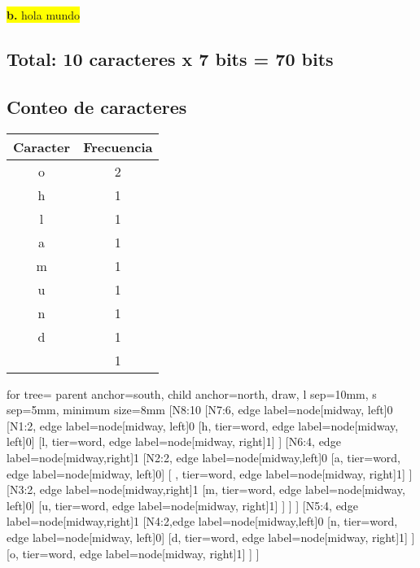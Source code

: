 \documentclass{article}
\begin{document}
	\vspace{0.5cm}
	\begin{center}
		\hspace{3cm}\colorbox{yellow}{{\textbf{b.} hola mundo}}\newline
		\subsection*{Total: 10 caracteres x 7 bits = 70 bits}
		\vspace{0.5cm}
		\subsection*{Conteo de caracteres}
		\begin{tabular}{c|c}
			\textbf{Caracter} & \textbf{Frecuencia} \\
			\hline
			o & 2 \\
			h & 1 \\
			l & 1 \\
			a & 1 \\
			m & 1 \\
			u & 1 \\
			n & 1 \\
			d & 1 \\
			  & 1 \\
		\end{tabular}
		
		\vspace{1cm}
		
		\begin{forest}
			for tree={
				parent anchor=south,
				child anchor=north,
				draw,
				l sep=10mm,
				s sep=5mm,
				minimum size=8mm
			}
			[N8:10
				[N7:6, edge label={node[midway, left]{0}}
					[N1:2, edge label={node[midway, left]{0}}
						[h, tier=word, edge label={node[midway, left]{0}}]
						[l, tier=word, edge label={node[midway, right]{1}}]	
					]
					[N6:4, edge label={node[midway,right]{1}}
						[N2:2, edge label={node[midway,left]{0}}
							[a, tier=word, edge label={node[midway, left]{0}}]
							[ , tier=word, edge label={node[midway, right]{1}}]	
						]
						[N3:2, edge label={node[midway,right]{1}}
							[m, tier=word, edge label={node[midway, left]{0}}]
							[u, tier=word, edge label={node[midway, right]{1}}]	
						]
					]
				]
				[N5:4, edge label={node[midway,right]{1}}
					[N4:2,edge label={node[midway,left]{0}}
						[n, tier=word, edge label={node[midway, left]{0}}]
						[d, tier=word, edge label={node[midway, right]{1}}]
					]
					[o, tier=word, edge label={node[midway, right]{1}}]
				]
			]
		\end{forest}
		

\end{center}
\end{document}
